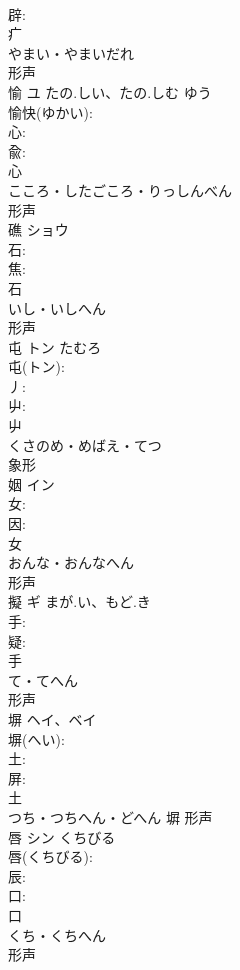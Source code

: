 \documentclass[8pt]{extreport}
\begin{document}
\begin{CJK}{UTF8}{min}
\\	辟: 
\\	疒	
\\	やまい・やまいだれ	
\\	形声 
\\	愉	ユ	たの.しい、たの.しむ	ゆう	
\\	愉快(ゆかい): 
\\	心: 
\\	兪: 
\\	心	
\\	こころ・したごころ・りっしんべん	
\\	形声 
\\	礁	ショウ			
\\	石: 
\\	焦: 
\\	石	
\\	いし・いしへん	
\\	形声 
\\	屯	トン	たむろ		
\\	屯(トン): 
\\	丿: 
\\	屮: 
\\	屮	
\\	くさのめ・めばえ・てつ	
\\	象形 
\\	姻	イン			
\\	女: 
\\	因: 
\\	女	
\\	おんな・おんなへん	
\\	形声 
\\	擬	ギ	まが.い、もど.き		
\\	手: 
\\	疑: 
\\	手	
\\	て・てへん	
\\	形声 
\\	塀	ヘイ、ベイ			
\\	塀(へい): 
\\	土: 
\\	屏: 
\\	土	
\\	つち・つちへん・どへん	塀	形声 
\\	唇	シン	くちびる		
\\	唇(くちびる): 
\\	辰: 
\\	口: 
\\	口	
\\	くち・くちへん	
\\	形声 

\end{CJK}
\end{document}
